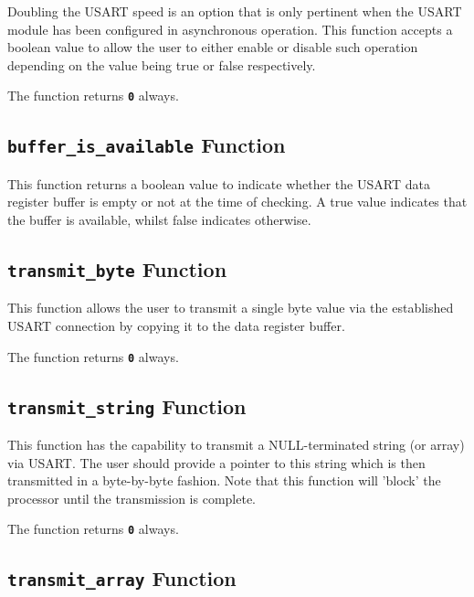 \documentclass[a4paper, oneside, 11pt, titlepage, onecolumn, openright]{report}
\begin{document}
					Doubling the USART speed is an option that is only pertinent when the USART module has been configured in asynchronous operation. This function accepts a boolean value to allow the user to either enable or disable such operation depending on the value being true or false respectively.
			
The function returns \textbf{\texttt{0}} always.

				\subsection{\textbf{\texttt{buffer\_is\_available}} Function}
					\label{ss:Hardware Abstraction Libraries:usart Module:buffer_is_availableFunction}
			
					This function returns a boolean value to indicate whether the USART data register buffer is empty or not at the time of checking. A true value indicates that the buffer is available, whilst false indicates otherwise.
			
				\subsection{\textbf{\texttt{transmit\_byte}} Function}
					\label{ss:Hardware Abstraction Libraries:usart Module:transmit_byteFunction}
			
					This function allows the user to transmit a single byte value via the established USART connection by copying it to the data register buffer.
							
The function returns \textbf{\texttt{0}} always.
			
				\subsection{\textbf{\texttt{transmit\_string}} Function}
					\label{ss:Hardware Abstraction Libraries:usart Module:transmit_stringFunction}
			
					This function has the capability to transmit a NULL-terminated string (or array) via USART. The user should provide a pointer to this string which is then transmitted in a byte-by-byte fashion. Note that this function will 'block' the processor until the transmission is complete.
			
The function returns \textbf{\texttt{0}} always.
			
				\subsection{\textbf{\texttt{transmit\_array}} Function}
					\label{ss:Hardware Abstraction Libraries:usart Module:transmit_arrayFunction}
			
\end{document}
